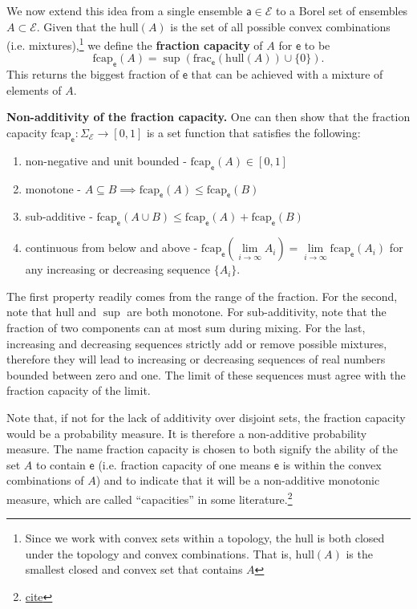 \documentclass[10pt,twocolumn, nofootinbib]{revtex4-2}
\newcommand\hull{\mathrm{hull}}
\newcommand\fraction{\mathrm{frac}}
\newcommand\frcap{\mathrm{fcap}}
\newcommand{\ens}[1][e] {\mathsf{#1}} %
\newcommand{\Ens}[1][E] {\mathcal{#1}} %
\begin{document}
We now extend this idea from a single ensemble $\ens[a] \in \Ens$ to a Borel set of ensembles $A \subset \Ens$. Given that the $\hull(A)$ is the set of all possible convex combinations (i.e. mixtures),\footnote{Since we work with convex sets within a topology, the hull is both closed under the topology and convex combinations. That is, $\hull(A)$ is the smallest closed and convex set that contains $A$} we define the \textbf{fraction capacity} of $A$ for $\ens$ to be
\begin{equation}
	\frcap_{\ens}(A) = \sup(\fraction_{\ens}(\hull(A))\cup\{0\}).
\end{equation}
This returns the biggest fraction of $\ens$ that can be achieved with a mixture of elements of $A$.

\textbf{Non-additivity of the fraction capacity.} One can then show that the fraction capacity $\frcap_{\ens} : \Sigma_{\Ens} \to [0,1]$ is a set function that satisfies the following:
\begin{enumerate}
	\item non-negative and unit bounded - $\frcap_{\ens}(A) \in [0,1]$
	\item monotone - $A \subseteq B \implies \frcap_{\ens}(A) \leq \frcap_{\ens}(B)$
	\item sub-additive - $\frcap_{\ens}(A \cup B) \leq \frcap_{\ens}(A) + \frcap_{\ens}(B)$
	\item continuous from below and above - $\frcap_{\ens}(\lim\limits_{i \to \infty} A_i) = \lim\limits_{i \to \infty} \frcap_{\ens}(A_i)$ for any increasing or decreasing sequence $\{A_i\}$.
\end{enumerate}

The first property readily comes from the range of the fraction. For the second, note that $\hull$ and $\sup$ are both monotone. For sub-additivity, note that the fraction of two components can at most sum during mixing. For the last, increasing and decreasing sequences strictly add or remove possible mixtures, therefore they will lead to increasing or decreasing sequences of real numbers bounded between zero and one. The limit of these sequences must agree with the fraction capacity of the limit.

Note that, if not for the lack of additivity over disjoint sets, the fraction capacity would be a probability measure. It is therefore a non-additive probability measure. The name fraction capacity is chosen to both signify the ability of the set $A$ to contain $\ens$ (i.e. fraction capacity of one means $\ens$ is within the convex combinations of $A$) and to indicate that it will be a non-additive monotonic measure, which are called ``capacities'' in some literature.\footnote{ \href{ https://link.springer.com/book/10.1007/978-3-319-03155-2}{cite} }
\end{document}
